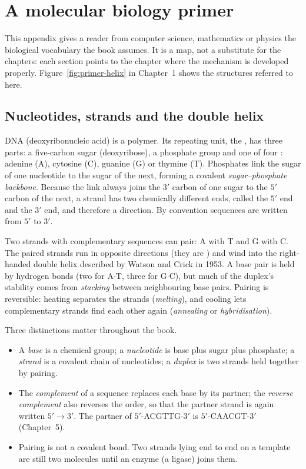 \chapter{A molecular biology primer}\label{app:biology}

This appendix gives a reader from computer science, mathematics or physics the
biological vocabulary the book assumes. It is a map, not a substitute for the
chapters: each section points to the chapter where the mechanism is developed
properly. Figure~\ref{fig:primer-helix} in Chapter~1 shows the structures
referred to here.

\section{Nucleotides, strands and the double helix}
DNA (deoxyribonucleic acid) is a polymer. Its repeating unit, the
, has three parts: a five-carbon sugar (deoxyribose), a
phosphate group and one of four : adenine (A), cytosine (C),
guanine (G) or thymine (T). Phosphates link the sugar of one nucleotide to the
sugar of the next, forming a covalent \emph{sugar--phosphate backbone}. Because
the link always joins the $3'$ carbon of one sugar to the $5'$ carbon of the
next, a strand has two chemically different ends, called the $5'$ end and the
$3'$ end, and therefore a direction. By convention sequences are written from
$5'$ to $3'$.

Two strands with complementary sequences can pair: A with T and G with C. The
paired strands run in opposite directions (they are ) and
wind into the right-handed double helix described by Watson and Crick in
1953.\cite{WatsonCrick1953} A base pair is held by hydrogen bonds (two for
A$\cdot$T, three for G$\cdot$C), but much of the duplex's stability comes from
\emph{stacking} between neighbouring base pairs. Pairing is reversible: heating
separates the strands (\emph{melting}), and cooling lets complementary strands
find each other again (\emph{annealing} or \emph{hybridisation}).

Three distinctions matter throughout the book.
\begin{itemize}
\item A \emph{base} is a chemical group; a \emph{nucleotide} is base plus sugar
plus phosphate; a \emph{strand} is a covalent chain of nucleotides; a
\emph{duplex} is two strands held together by pairing.
\item The \emph{complement} of a sequence replaces each base by its partner; the
\emph{reverse complement} also reverses the order, so that the partner strand is
again written $5'\to3'$. The partner of $5'$-ACGTTG-$3'$ is
$5'$-CAACGT-$3'$ (Chapter~5).
\item Pairing is not a covalent bond. Two strands lying end to end on a
template are still two molecules until an enzyme (a ligase) joins them.
\end{itemize}

